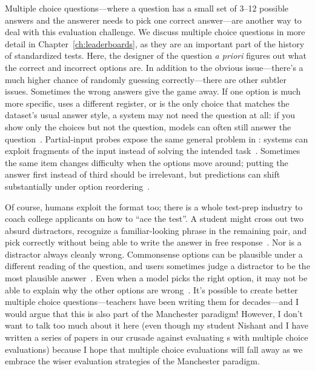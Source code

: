 Multiple choice questions---where a question has a small set of 3--12
possible answers and the answerer needs to pick one correct
answer---are another way to deal with this evaluation challenge.
%
We discuss multiple choice questions in more detail in Chapter~\ref{ch:leaderboards}, as they are an important part of the history of standardized tests.
%
Here, the designer of the question \textit{a priori} figures out what the correct and incorrect options are.
%
In addition to the obvious issue---there's a much higher chance of randomly guessing correctly---there are other subtler issues.
%
Sometimes the wrong answers give the game away. If one option is much more
specific, uses a different register, or is the only choice that matches the
dataset's usual answer style, a system may not need the question at all:
if you show only the choices but not the question, models can often still
answer the question~\citep{Balepur2024ArtifactsOA}. Partial-input probes expose
the same general problem in : systems can exploit fragments of the input
instead of solving the intended task~\citep{richardson2020does}. Sometimes
the same item changes difficulty when the options move around; putting the
answer first instead of third should be irrelevant, but  predictions
can shift substantially under option reordering~\citep{pezeshkpour2023large}.

Of course, humans exploit the format too; there is a whole test-prep industry
to coach college applicants on how to ``ace the test''.
%
A student might cross out two absurd
distractors, recognize a familiar-looking phrase in the remaining pair, and pick
correctly without being able to write the answer in free response~\citep{mckenna2019multiple}.
%
Nor is a distractor always cleanly wrong.
%
Commonsense options can be plausible under a different reading of
the question, and users sometimes judge a distractor to be the most plausible
answer~\citep{Palta2024PlausiblyPQ}.
%
Even when a model picks the right option,
it may not be able to explain why the other options are wrong~\citep{balepur-etal-2024-easy}.
%
It's possible to create better multiple choice questions---teachers
have been writing them for decades---and I would argue that this is
also part of the Manchester paradigm!
%
However, I don't want to talk too much about it here (even though my
student Nishant and I have written a series of papers in our crusade
against evaluating s with multiple choice evaluations) because
I hope that multiple choice evaluations will fall away as we embrace
the wiser evaluation strategies of the Manchester paradigm.

